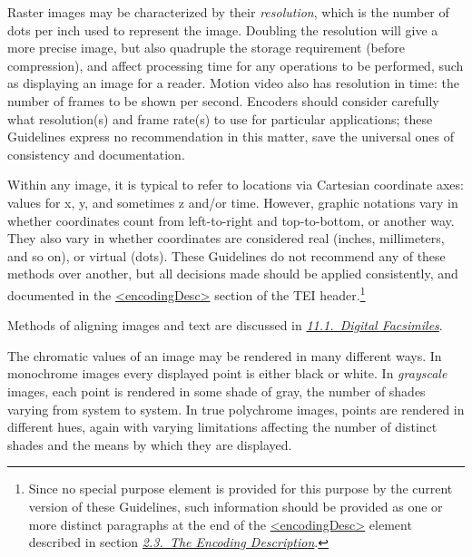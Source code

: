Raster images may be characterized by their \textit{resolution}, which is the number of dots per inch used to represent the image. Doubling the resolution will give a more precise image, but also quadruple the storage requirement (before compression), and affect processing time for any operations to be performed, such as displaying an image for a reader. Motion video also has resolution in time: the number of frames to be shown per second. Encoders should consider carefully what resolution(s) and frame rate(s) to use for particular applications; these Guidelines express no recommendation in this matter, save the universal ones of consistency and documentation.\par
Within any image, it is typical to refer to locations via Cartesian coordinate axes: values for x, y, and sometimes z and/or time. However, graphic notations vary in whether coordinates count from left-to-right and top-to-bottom, or another way. They also vary in whether coordinates are considered real (inches, millimeters, and so on), or virtual (dots). These Guidelines do not recommend any of these methods over another, but all decisions made should be applied consistently, and documented in the \hyperref[TEI.encodingDesc]{<encodingDesc>} section of the TEI header.\footnote{Since no special purpose element is provided for this purpose by the current version of these Guidelines, such information should be provided as one or more distinct paragraphs at the end of the \hyperref[TEI.encodingDesc]{<encodingDesc>} element described in section \textit{\hyperref[HD5]{2.3.\ The Encoding Description}}.}\par
Methods of aligning images and text are discussed in \textit{\hyperref[PHFAX]{11.1.\ Digital Facsimiles}}.\par
The chromatic values of an image may be rendered in many different ways. In monochrome images every displayed point is either black or white. In \textit{grayscale} images, each point is rendered in some shade of gray, the number of shades varying from system to system. In true polychrome images, points are rendered in different hues, again with varying limitations affecting the number of distinct shades and the means by which they are displayed.
